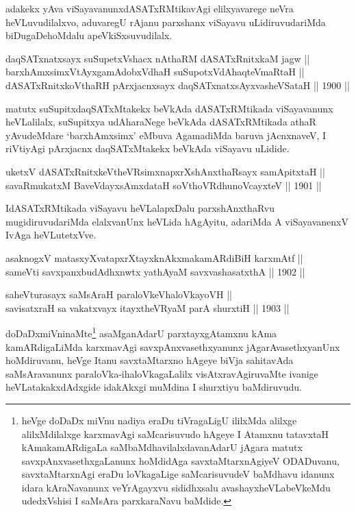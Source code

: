 \begin{artha}
adakekx yAva viSayavanunxdASATxRMtikavAgi elilxyavarege neVra
heVLuvudilalxvo, aduvaregU rAjanu parxshanx viSayavu uLidiruvudariMda
biDugaDehoMdalu apeVkiSxsuvudilalx.
\end{artha}

\begin{shl}
daqSATxnatxsayx suSupetxVshacx nAthaRM dASATxRnitxkaM jagw || \\
barxhAmxsimxVtAyxgamAdobxVdhaH suSupotxVdAhaqteVmaRtaH || \\
dASATxRnitxkoV\s thaRH pArxjacnxsayx daqSATxnatxsAyxvasheVSataH ||  1900 ||  
\end{shl}

\begin{artha}
matutx suSupitxdaqSATxMtakekx beVkAda dASATxRMtikada viSayavanunx
heVLalilalx, suSupitxya udAharaNege beVkAda dASATxRMtikada athaR
yAvudeMdare `barxhAmxsimx' eMbuva AgamadiMda baruva jAcnxnaveV, I
riVtiyAgi pArxjacnx daqSATxMtakekx beVkAda viSayavu uLidide.
\end{artha}

\begin{shl}
uketxV dASATxRnitxkeV\s theVR\s simxnapxrXshAnxthaRsayx samApitxtaH || \\
savaRmukatxM BaveVdayxsAmxdataH soV\s thoVR\s dhunoVcayxteV ||  1901 ||  
\end{shl}

\begin{artha}
IdASATxRMtikada viSayavu heVLalapxDalu parxshAnxthaRvu
mugidiruvudariMda elalxvanUnx heVLida hAgAyitu, adariMda A
viSayavanenxV IvAga heVLutetxVve.
\end{artha}

\begin{shl}
asaknogxV matasxyXvatapxrXtayxknAkxmakamARdiBiH karxmAtf || \\
sameVti savxpanxbudAdhxnwtx yathA\s yaM savxvashasatxthA ||  1902 ||  
\end{shl}

\begin{shl}
saheVturasayx saMsAraH paraloVkeVhaloVkayoVH || \\
savisatxraH sa vakatxvayx itayxtheVRyaM parA shurxtiH ||  1903 ||  
\end{shl}

\begin{artha}
doDaDxmiVninaMte\footnote[1]{heVge doDaDx miVnu nadiya eraDu
tiVragaLigU ililxMda alilxge alilxMdilalxge karxmavAgi saMcarisuvudo
hAgeye I Atamxnu tatavxtaH kAmakamARdigaLa saMbaMdhavilalxdavanAdarU
jAgara matutx savxpAnxvasethxgaLanunx hoMdidAga savxtaMtarxnAgiyeV
ODADuvanu, savxtaMtarxnAgi eraDu loVkagaLige saMcarisuvudeV baMdhavu
idanunx idara kAraNavanunx veYrAgayxvu sididhxsalu avashayxheVLabeVkeMdu udedxVshisi I saMsAra parxkaraNavu baMdide.} asaMganAdarU parxtayxgAtamxnu kAma
kamARdigaLiMda karxmavAgi savxpAnxvasethxyanunx jAgarAvasethxyanUnx
hoMdiruvanu, heVge Itanu savxtaMtarxno hAgeye biVja sahitavAda
saMsAravanunx paraloVka-ihaloVkagaLalilx visAtxravAgiruvaMte ivanige
heVLatakakxdAdxgide idakAkxgi muMdina I shurxtiyu baMdiruvudu.
\end{artha}

